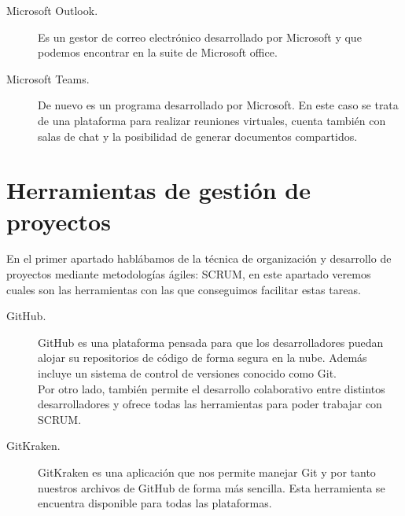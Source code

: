 \begin{description}
\item[Microsoft Outlook. \cite{wikiOutlook}] Es un gestor de correo electrónico desarrollado por Microsoft y que podemos encontrar en la suite de Microsoft office.

\item[Microsoft Teams. \cite{wikiTeams}] De nuevo es un programa desarrollado por Microsoft. En este caso se trata de una plataforma para realizar reuniones virtuales, cuenta también con salas de chat y la posibilidad de generar documentos compartidos.
\end{description}


\section{Herramientas de gestión de proyectos}\label{sec:HGestionProyectos}
En el primer apartado hablábamos de la técnica de organización y desarrollo de proyectos mediante metodologías ágiles: SCRUM, en este apartado veremos cuales son las herramientas con las que conseguimos facilitar estas tareas.

\begin{description}
\item[GitHub. \cite{GitHub}]
GitHub es una plataforma pensada para que los desarrolladores puedan alojar su repositorios de código de forma segura en la nube. Además incluye un sistema de control de versiones conocido como Git. \\
Por otro lado, también permite el desarrollo colaborativo entre distintos desarrolladores y ofrece todas las herramientas para poder trabajar con SCRUM. 

\item[GitKraken. \cite{GitKraken}]
GitKraken es una aplicación que nos permite manejar Git y por tanto nuestros archivos de GitHub de forma más sencilla. Esta herramienta se encuentra disponible para todas las plataformas.
\end{description}










